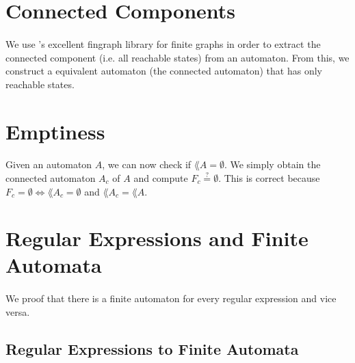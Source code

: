 \documentclass[11pt,a4paper,oneside]{book}
\begin{document}
                    \vspace{-0.4cm}
                    \vspace{-0.4cm}

        \section{Connected Components}
            \paragraph{} 
            We use \ssreflect's excellent fingraph library for finite graphs in order to extract the connected component (i.e. all reachable states) from an automaton.
            From this, we construct a equivalent automaton (the connected automaton) that has only reachable states.

        \section{Emptiness}
            \paragraph{}
                Given an automaton $A$, we can now check if $\lang{A} = \emptyset$. We simply obtain the connected automaton $A_c$ of $A$ and compute $F_c \stackrel{?}{=} \emptyset$. This is correct because $F_c = \emptyset \Leftrightarrow \lang{A_c} = \emptyset$ and $\lang{A_c} = \lang{A}$.

        \section{Regular Expressions and Finite Automata}

            \paragraph{} 
                We proof that there is a finite automaton for every regular expression and vice versa. 

            \subsection{Regular Expressions to Finite Automata}
\end{document}
